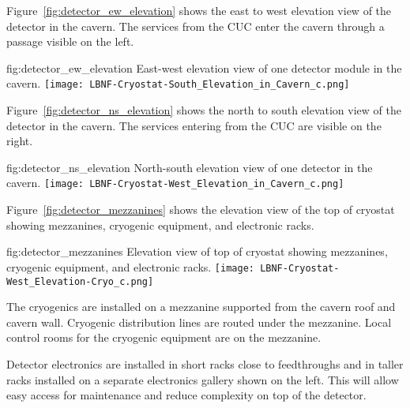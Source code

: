 Figure~\ref{fig:detector_ew_elevation} shows the east to west elevation view of the
detector in the cavern. The services from the
CUC enter the cavern through a passage visible on the left.
\begin{dunefigure}{fig:detector_ew_elevation}
  {East-west elevation view of one detector module in the cavern.}
  \texttt{[image: LBNF-Cryostat-South\_Elevation\_in\_Cavern\_c.png]}
\end{dunefigure}

Figure~\ref{fig:detector_ns_elevation} shows the north to south elevation view of the
detector in the cavern. The services entering
from the CUC are visible on the right.
\begin{dunefigure}{fig:detector_ns_elevation}
  {North-south elevation view of one detector in the cavern.}
  \texttt{[image: LBNF-Cryostat-West\_Elevation\_in\_Cavern\_c.png]}
\end{dunefigure}

Figure~\ref{fig:detector_mezzanines} shows the elevation view of the
top of cryostat showing mezzanines, cryogenic equipment, and electronic
racks.
\begin{dunefigure}{fig:detector_mezzanines}
  {Elevation view of top of cryostat showing mezzanines, cryogenic
    equipment, and electronic racks.}
  \texttt{[image: LBNF-Cryostat-West\_Elevation-Cryo\_c.png]}
\end{dunefigure}
The cryogenics are installed on a mezzanine supported from
the cavern roof and cavern wall. Cryogenic distribution lines are
routed under the mezzanine. Local control rooms for the
cryogenic equipment are on the mezzanine.

Detector electronics are installed in short racks close to
feedthroughs and in taller racks installed on a separate
electronics gallery shown on the left. This will allow easy access
for maintenance and reduce complexity on top of the detector.
